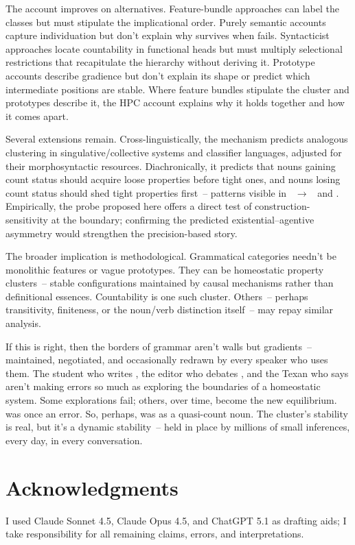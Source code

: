 \documentclass[12pt,a4paper]{article}
\begin{document}
The account improves on alternatives. Feature-bundle approaches can label the classes but must stipulate the implicational order. Purely semantic accounts capture individuation but don't explain why  survives when  fails. Syntacticist approaches locate countability in functional heads but must multiply selectional restrictions that recapitulate the hierarchy without deriving it. Prototype accounts describe gradience but don't explain its shape or predict which intermediate positions are stable. Where feature bundles stipulate the cluster and prototypes describe it, the HPC account explains why it holds together and how it comes apart.

Several extensions remain. Cross-linguistically, the mechanism predicts analogous clustering in singulative/collective systems and classifier languages, adjusted for their morphosyntactic resources. Diachronically, it predicts that nouns gaining count status should acquire loose properties before tight ones, and nouns losing count status should shed tight properties first~-- patterns visible in ~$\to$~ and . Empirically, the  probe proposed here offers a direct test of construction-sensitivity at the boundary; confirming the predicted existential--agentive asymmetry would strengthen the precision-based story.

The broader implication is methodological. Grammatical categories needn't be monolithic features or vague prototypes. They can be homeostatic property clusters~-- stable configurations maintained by causal mechanisms rather than definitional essences. Countability is one such cluster. Others~-- perhaps transitivity, finiteness, or the noun/verb distinction itself~-- may repay similar analysis.

If this is right, then the borders of grammar aren't walls but gradients~-- maintained, negotiated, and occasionally redrawn by every speaker who uses them. The student who writes , the editor who debates , and the Texan who says  aren't making errors so much as exploring the boundaries of a homeostatic system. Some explorations fail; others, over time, become the new equilibrium.  was once an error. So, perhaps, was  as a quasi-count noun. The cluster's stability is real, but it's a dynamic stability~-- held in place by millions of small inferences, every day, in every conversation.

\section*{Acknowledgments}

I used Claude Sonnet 4.5, Claude Opus 4.5, and ChatGPT 5.1 as drafting aids; I take responsibility for all remaining claims, errors, and interpretations.

\newpage

\printbibliography
\end{document}
